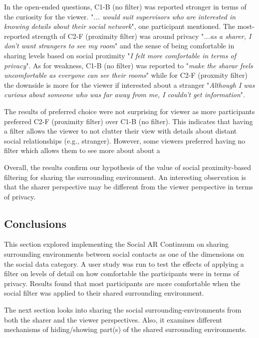 In the open-ended questions, C1-B (no filter) was reported stronger in terms of the curiosity for the viewer. "\textit{... would suit supervisors who are interested in knowing details about their social network}", one participant mentioned. The most-reported strength of C2-F (proximity filter) was around privacy "\textit{...as a sharer, I don't want strangers to see my room}" and the sense of being comfortable in sharing levels based on social proximity "\textit{I felt more comfortable in terms of privacy}". As for weakness, C1-B (no filter) was reported to "\textit{make the sharar feels uncomfortable as everyone can see their rooms}" while for C2-F (proxmity filter) the downside is more for the viewer if interested about a stranger "\textit{Although I was curious about someone who was far away from me, I couldn't get information}".

The results of preferred choice were not surprising for viewer as more participants preferred C2-F (proximity filter) over C1-B (no filter). This indicates that having a filter allows the viewer to not clutter their view with details about distant social relationships (e.g., stranger). However, some viewers preferred having no filter which allows them to see more about about a

Overall, the results confirm our hypothesis of the value of social proximity-based filtering for sharing the surrounding environment. An interesting observation is that the sharer perspective may be different from the viewer perspective in terms of privacy. 


\subsection{Conclusions}

This section explored implementing the Social AR Continuum on sharing surrounding environments between social contacts as one of the dimensions on the social data category. A user study was run to test the effects of applying a filter on levels of detail on how comfortable the participants were in terms of privacy. Results found that most participants are more comfortable when the social filter was applied to their shared surrounding environment.

The next section looks into sharing the social surrounding-environments from both the sharer and the viewer perspectives. Also, it examines different mechanisms of hiding/showing part(s) of the shared surrounding environments. 